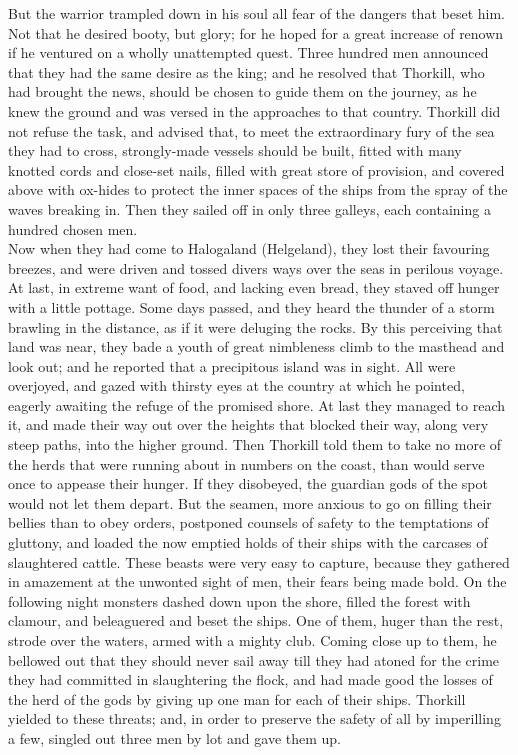 \documentclass[10pt,a4paper]{report}
\begin{document}
But the warrior trampled down in his soul all fear of the dangers that beset him. Not that he desired booty, but glory; for he hoped for a great increase of renown if he ventured on a wholly unattempted quest. Three hundred men announced that they had the same desire as the king; and he resolved that Thorkill, who had brought the news, should be chosen to guide them on the journey, as he knew the ground and was versed in the approaches to that country. Thorkill did not refuse the task, and advised that, to meet the extraordinary fury of the sea they had to cross, strongly-made vessels should be built, fitted with many knotted cords and close-set nails, filled with great store of provision, and covered above with ox-hides to protect the inner spaces of the ships from the spray of the waves breaking in. Then they sailed off in only three galleys, each containing a hundred chosen men.\\

Now when they had come to Halogaland (Helgeland), they lost their favouring breezes, and were driven and tossed divers ways over the seas in perilous voyage. At last, in extreme want of food, and lacking even bread, they staved off hunger with a little pottage. Some days passed, and they heard the thunder of a storm brawling in the distance, as if it were deluging the rocks. By this perceiving that land was near, they bade a youth of great nimbleness climb to the masthead and look out; and he reported that a precipitous island was in sight. All were overjoyed, and gazed with thirsty eyes at the country at which he pointed, eagerly awaiting the refuge of the promised shore. At last they managed to reach it, and made their way out over the heights that blocked their way, along very steep paths, into the higher ground. Then Thorkill told them to take no more of the herds that were running about in numbers on the coast, than would serve once to appease their hunger. If they disobeyed, the guardian gods of the spot would not let them depart. But the seamen, more anxious to go on filling their bellies than to obey orders, postponed counsels of safety to the temptations of gluttony, and loaded the now emptied holds of their ships with the carcases of slaughtered cattle. These beasts were very easy to capture, because they gathered in amazement at the unwonted sight of men, their fears being made bold. On the following night monsters dashed down upon the shore, filled the forest with clamour, and beleaguered and beset the ships. One of them, huger than the rest, strode over the waters, armed with a mighty club. Coming close up to them, he bellowed out that they should never sail away till they had atoned for the crime they had committed in slaughtering the flock, and had made good the losses of the herd of the gods by giving up one man for each of their ships. Thorkill yielded to these threats; and, in order to preserve the safety of all by imperilling a few, singled out three men by lot and gave them up.\\
\end{document}
